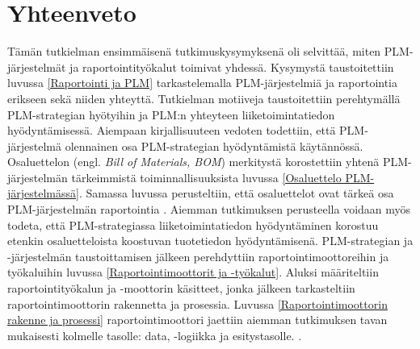 \chapter{Yhteenveto} \label{Yhteenveto}

Tämän tutkielman ensimmäisenä tutkimuskysymyksenä oli selvittää, miten PLM-järjestelmät ja raportointityökalut toimivat yhdessä. Kysymystä taustoitettiin luvussa \ref{Raportointi ja PLM} tarkastelemalla PLM-järjestelmiä ja raportointia erikseen sekä niiden yhteyttä. Tutkielman motiiveja taustoitettiin perehtymällä PLM-strategian hyötyihin ja PLM:n yhteyteen liiketoimintatiedon hyödyntämisessä. Aiempaan kirjallisuuteen vedoten todettiin, että PLM-järjestelmä olennainen osa PLM-strategian hyödyntämistä käytännössä.\cite{alemanni_key_2008} Osaluettelon (engl. \textit{Bill of Materials, BOM}) merkitystä korostettiin yhtenä PLM-järjestelmän tärkeimmistä toiminnallisuuksista\cite{david_what_2016} luvussa \ref{Osaluettelo PLM-järjestelmässä}. Samassa luvussa perusteltiin, että osaluettelot ovat tärkeä osa PLM-järjestelmän raportointia \cite{german_challenge_2016}. Aiemman tutkimuksen perusteella voidaan myös todeta, että PLM-strategiassa liiketoimintatiedon hyödyntäminen korostuu etenkin osaluetteloista koostuvan tuotetiedon hyödyntämisenä. \cite{bayro-corrochano_preliminary_2014}  PLM-strategian ja -järjestelmän taustoittamisen jälkeen perehdyttiin raportointimoottoreihin ja työkaluihin luvussa \ref{Raportointimoottorit ja -työkalut}. Aluksi määriteltiin raportointityökalun ja -moottorin käsitteet, jonka jälkeen tarkasteltiin raportointimoottorin rakennetta ja prosessia. Luvussa \ref{Raportointimoottorin rakenne ja prosessi} raportointimoottori jaettiin aiemman tutkimuksen tavan mukaisesti kolmelle tasolle: data, -logiikka ja esitystasolle. \cite{he_design_2010}.

